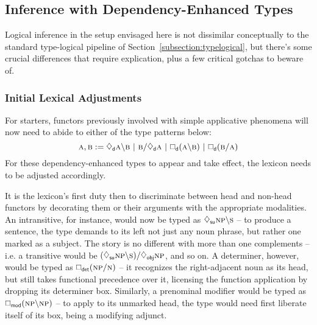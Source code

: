 \subsection{Inference with Dependency-Enhanced Types}
Logical inference in the setup envisaged here is not dissimilar conceptually to the standard type-logical pipeline of Section~\ref{subsection:typelogical}, but there's some crucial differences that require explication, plus a few critical gotchas to beware of.

\subsubsection{Initial Lexical Adjustments}
For starters, functors previously involved with simple applicative phenomena will now need to abide to either of the type patterns below:
\begin{equation}\label{equation:dependency_functors}
	\prop{a}, \prop{b} := \ddia{d}\prop{a} \divleft \prop{b} \ | \ \prop{b}\divright \ddia{d}\prop{a} \ | \  \dbox{d}(\prop{a}\divleft\prop{b}) \ | \ \dbox{d}(\prop{b} \divright \prop{a}) 
\end{equation}
For these dependency-enhanced types to appear and take effect, the lexicon needs to be adjusted accordingly.

It is the lexicon's first duty then to discriminate between head and non-head functors by decorating them or their arguments with the appropriate modalities.
An intransitive, for instance, would now be typed as $\ddia{su}\np[s]\divleft\s[s]$ -- to produce a sentence, the type demands to its left not just any noun phrase, but rather one marked as a subject.
The story is no different with more than one complements -- i.e. a transitive would be $(\ddia{su}\np[s]\divleft\s[s])\divright\ddia{obj}\np[s]$, and so on.
A determiner, however, would be typed as $\dbox{det}(\np[s]\divright\n[s])$ -- it recognizes the right-adjacent noun as its head, but still takes functional precedence over it, licensing the function application by dropping its determiner box.
Similarly, a prenominal modifier would be typed as $\dbox{mod}(\np[s]\divleft\np[s])$ -- to apply to its unmarked head, the type would need first liberate itself of its box, being a modifying adjunct.

